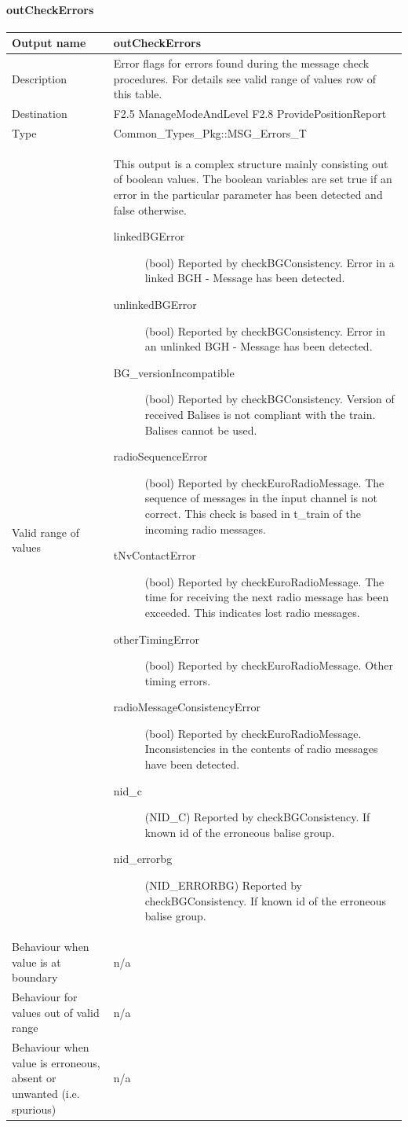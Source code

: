\paragraph{outCheckErrors}

\begin{longtable}{p{}p{}}
\toprule
Output name				& outCheckErrors \\
\midrule
Description				& Error flags for errors found during the message check procedures. For details see valid range of values row of this table.\\
\midrule
Destination				& F2.5 ManageModeAndLevel\newline
F2.8 ProvidePositionReport\\ 
\midrule
Type					& Common\_Types\_Pkg::MSG\_Errors\_T\\
\midrule
Valid range of values	& This output is a complex structure mainly consisting out of boolean values. The boolean variables are set true if an error in the particular parameter has been detected and false otherwise.
\begin{description}
\item[linkedBGError](bool) Reported by checkBGConsistency. Error in a linked BGH - Message has been detected.
\item[unlinkedBGError](bool) Reported by checkBGConsistency. Error in an unlinked BGH - Message has been detected.
\item[BG\_versionIncompatible](bool) Reported by checkBGConsistency. Version of received Balises is not compliant with the train. Balises cannot be used.
\item[radioSequenceError](bool) Reported by checkEuroRadioMessage. The sequence of messages in the input channel is not correct. This check is based in t\_train of the incoming radio messages.
\item[tNvContactError](bool) Reported by checkEuroRadioMessage. The time for receiving the next radio message has been exceeded. This indicates lost radio messages.
\item[otherTimingError](bool) Reported by checkEuroRadioMessage. Other timing errors.
\item[radioMessageConsistencyError](bool) Reported by checkEuroRadioMessage. Inconsistencies in the contents of radio messages have been detected.
\item[nid\_c](NID\_C) Reported by checkBGConsistency. If known id of the erroneous balise group.
\item[nid\_errorbg](NID\_ERRORBG) Reported by checkBGConsistency. If known id of the erroneous balise group.
\end{description}
\\
\midrule
Behaviour when value is at boundary	& n/a\\
\midrule
Behaviour for values out of valid range	& n/a\\
\midrule
Behaviour when value is erroneous, absent or unwanted (i.e. spurious) & n/a\\
\bottomrule
\end{longtable}



